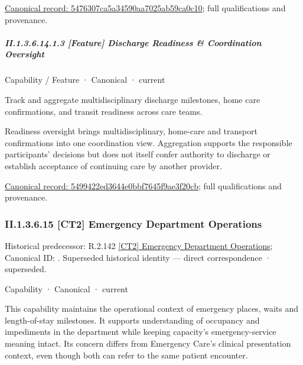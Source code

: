 {\footnotesize \href{../../../../continuum/strategy/capability/feature/5476307ca5a34590aa7025ab59ca0c10.md}{Canonical record: 5476307ca5a34590aa7025ab59ca0c10}; full qualifications and provenance.}\par
\subparagraph*{II.1.3.6.14.1.3 [Feature] Discharge Readiness \& Coordination Oversight}
\label{navigation:II.1.3.6.14.1.3}

\label{element:5499422ed3644e0bbf7645f9ae3f20cb}
{\small Capability / Feature · Canonical · current}\par

Track and aggregate multidisciplinary discharge milestones, home care confirmations, and transit readiness across care teams.



Readiness oversight brings multidisciplinary, home-care and transport confirmations into one coordination view. Aggregation supports the responsible participants' decisions but does not itself confer authority to discharge or establish acceptance of continuing care by another provider.


{\footnotesize \href{../../../../continuum/strategy/capability/feature/5499422ed3644e0bbf7645f9ae3f20cb.md}{Canonical record: 5499422ed3644e0bbf7645f9ae3f20cb}; full qualifications and provenance.}\par
\subsubsection*{II.1.3.6.15 [CT2] Emergency Department Operations}
\label{navigation:II.1.3.6.15}

{\small Historical predecessor: R.2.142 \hyperref[element:8963b571e9cc40e49c5d738e31d2f97e]{[CT2] Emergency Department Operations}; Canonical ID: \texttt{}. Superseded historical identity — direct correspondence · superseded.}\par
\label{element:24a4b5815faa4d369bc756a6e97d3e9e}
{\small Capability · Canonical · current}\par

This capability maintains the operational context of emergency places, waits and length-of-stay milestones. It supports understanding of occupancy and impediments in the department while keeping capacity's emergency-service meaning intact. Its concern differs from Emergency Care's clinical presentation context, even though both can refer to the same patient encounter.



